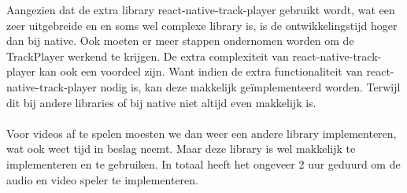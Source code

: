 Aangezien dat de extra library react-native-track-player gebruikt wordt, wat een zeer 
uitgebreide en en soms wel complexe library is, is de ontwikkelingstijd hoger dan bij native. 
Ook moeten er meer stappen ondernomen worden om de TrackPlayer werkend te krijgen.
De extra complexiteit van react-native-track-player kan ook een voordeel zijn. Want indien de
extra functionaliteit van react-native-track-player nodig is, kan deze makkelijk geïmplementeerd worden.
Terwijl dit bij andere libraries of bij native niet altijd even makkelijk is.
\\\\
Voor videos af te spelen moesten we dan weer een andere library implementeren, wat ook weet 
tijd in beslag neemt. Maar deze library is wel makkelijk te implementeren en te gebruiken.
In totaal heeft het ongeveer 2 uur geduurd om de audio en video speler te implementeren.

